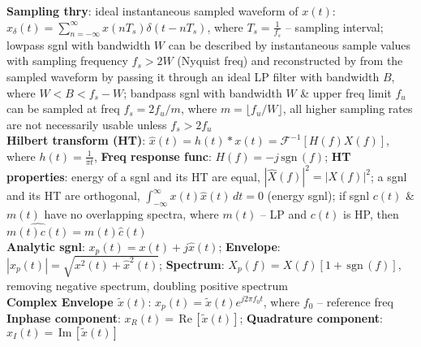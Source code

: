 \documentclass[UTF8,a4paper,10pt]{article}
\providecommand{\abs}[1]{\left\lvert#1\right\rvert}
\providecommand{\re}{\,\text{Re}\,}
\providecommand{\im}{\,\text{Im}\,}
\providecommand{\sgn}{\,\text{sgn}\,}
\begin{document}
\begin{multicols}{2}
    \textbf{Sampling thry}: ideal instantaneous sampled waveform of $x(t)$: $x_{\delta}(t)=\sum_{n=-\infty}^{\infty}x(nT_s)\delta(t-nT_s)$, where $T_s=\frac{1}{f_s}$ -- sampling interval; lowpass sgnl with bandwidth $W$ can be described by instantaneous sample values with sampling frequency $f_s>2W$ (Nyquist freq) and reconstructed by from the sampled waveform by passing it through an ideal LP filter with bandwidth $B$, where $W<B<f_s-W$; bandpass sgnl with bandwidth $W$ \& upper freq limit $f_u$ can be sampled at freq $f_s=2f_u/m$, where $m=\lfloor f_u/W\rfloor$, all higher sampling rates are not necessarily usable unless $f_s>2f_u$\\
    \textbf{Hilbert transform (HT)}: $\hat{x}(t)=h(t)*x(t)=\mathscr{F}^{-1}[H(f)X(f)]$, where $h(t)=\frac{1}{\pi t}$, \textbf{Freq response func}: $H(f)=-j\sgn(f)$; \textbf{HT properties}: energy of a sgnl and its HT are equal, $\abs{\hat{X}(f)}^2=\abs{X(f)}^2$; a sgnl and its HT are orthogonal, $\int_{-\infty}^{\infty}x(t)\hat{x}(t)\,dt=0$ (energy sgnl); if sgnl $c(t)$ \& $m(t)$ have no overlapping spectra, where $m(t)$ -- LP and $c(t)$ is HP, then $\widehat{m(t)c(t)}=m(t)\hat{c}(t)$\\
    \textbf{Analytic sgnl}: $x_p(t)=x(t)+j\hat{x}(t)$; \textbf{Envelope}: $\abs{x_p(t)}=\sqrt{x^2(t)+\hat{x}^2(t)}$; \textbf{Spectrum}: $X_p(f)=X(f)[1+\sgn(f)]$, removing negative spectrum, doubling positive spectrum\\
    \textbf{Complex Envelope $\tilde{x}(t)$}: $x_p(t)=\tilde{x}(t)e^{j2\pi f_0t}$, where $f_0$ -- reference freq\\
    \textbf{Inphase component}: $x_R(t)=\re[\tilde{x}(t)]$; \textbf{Quadrature component}: $x_I(t)=\im[\tilde{x}(t)]$\\


\end{multicols}
\end{document}
